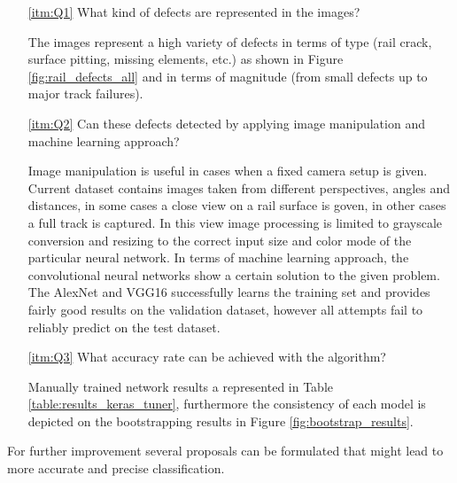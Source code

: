 \documentclass[10pt, final]{article}
\begin{document}
\begin{enumerate}
	\item[\ref{itm:Q1}] What kind of defects are represented in the images?

	      The images represent a high variety of defects in terms of type (rail crack, surface pitting, missing elements, etc.) as
	      shown in Figure \ref{fig:rail_defects_all} and in terms of magnitude (from small defects up to major track failures).
	\item[\ref{itm:Q2}] Can these defects detected by applying image manipulation and machine learning approach?

	      Image manipulation is useful in cases when a fixed camera setup is given.
	      Current dataset contains images taken from different perspectives, angles and distances, in some cases a close view
	      on a rail surface is goven, in other cases a full track is captured.
	      In this view image processing is limited to grayscale conversion and resizing to the correct input size and color mode
	      of the particular neural network.
	      In terms of machine learning approach, the convolutional neural networks show a certain solution to the given problem.
	      The AlexNet and VGG16 successfully learns the training set and provides fairly good results on the validation dataset,
	      however all attempts fail to reliably predict on the test dataset.
	\item[\ref{itm:Q3}] What accuracy rate can be achieved with the algorithm?

	      Manually trained network results a represented in Table \ref{table:results_keras_tuner}, furthermore the consistency
	      of each model is depicted on the bootstrapping results in Figure \ref{fig:bootstrap_results}.

\end{enumerate}

For further improvement several proposals can be formulated that might lead to more accurate and precise classification.
\end{document}
